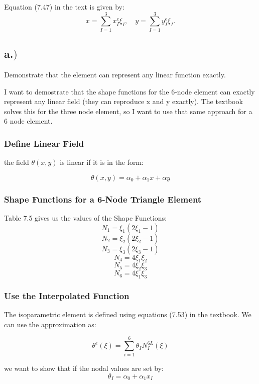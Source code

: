 \documentclass{article}
\begin{document}
Equation (7.47) in the text is given by:
\[
x = \sum_{I=1}^{3} x_I^e \xi_I, \quad y = \sum_{I=1}^{3} y_I^e \xi_I.
\]

\subsection*{a.$)$}
Demonstrate that the element can represent any linear function exactly.

I want to demostrate that the shape functions for the 6-node element can exactly represent any linear field (they can reproduce x and y exactly).
The textbook solves this for the three node element, so I want to use that same approach for a 6 node element.

\subsubsection*{Define Linear Field}
the field $\theta(x,y)$ is linear if it is in the form:

\begin{equation}
    \theta(x,y) = \alpha_0 + \alpha_1 x + \alpha y
    \label{eq:linear}
\end{equation}

\subsubsection*{Shape Functions for a 6-Node Triangle Element}
Table 7.5 gives us the values of the Shape Functions:
\[
    N_1 = \xi_1 (2 \xi_1 -1)
\]
\[
    N_2 = \xi_2 (2 \xi_2 -1)
\]
\[
    N_3 = \xi_3 (2 \xi_3 -1)
\]
\[
    N_4 = 4\xi_1\xi_2
\]
\[
    N_5 = 4\xi_2\xi_3
\]
\[
    N_6 = 4\xi_1\xi_3
\]

\subsubsection*{Use the Interpolated Function}
The isoparametric element is defined using equations (7.53) in the textbook. We can use the approximation as:

\begin{equation}
    \theta^{e}(\xi) = \sum_{i=1}^{6} \theta_I N_I^{6L}(\xi)
    \label{eq:sum}
\end{equation}

we want to show that if the nodal values are set by:
\begin{equation}
    \theta_I = \alpha_0 + \alpha_1 x_I
    \label{eq:theta}
\end{equation}
\end{document}
